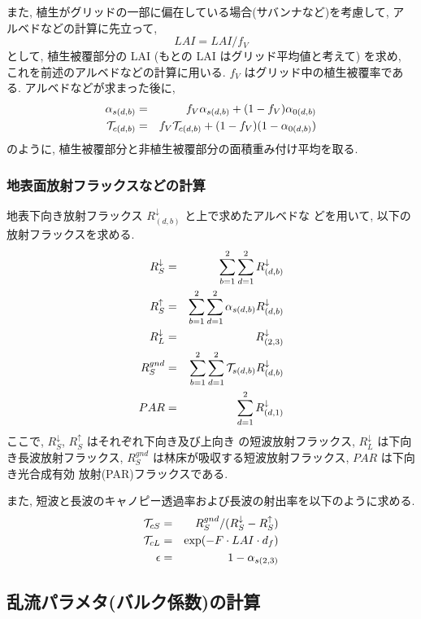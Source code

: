 また, 植生がグリッドの一部に偏在している場合(サバンナなど)を考慮して, ア
ルベドなどの計算に先立って,
\begin{equation}
  LAI = LAI / f_V
\end{equation}
として, 植生被覆部分の LAI (もとの LAI はグリッド平均値と考えて) を求め,
これを前述のアルベドなどの計算に用いる.
$f_V$ はグリッド中の植生被覆率である.
アルベドなどが求まった後に,
\begin{eqnarray}
  \alpha_{s(d,b)} &=& f_V \alpha_{s(d,b)}
                       + ( 1 - f_V ) \alpha_{0(d,b)} \\
  {\cal{T}}_{c(d,b)} &=& f_V {\cal{T}}_{c(d,b)}
                       + ( 1 - f_V ) ( 1 - \alpha_{0(d,b)} )
\end{eqnarray}
のように, 植生被覆部分と非植生被覆部分の面積重み付け平均を取る.

\subsubsection{地表面放射フラックスなどの計算}

地表下向き放射フラックス $R^{\downarrow}_{(d,b)}$ と上で求めたアルベドな
どを用いて, 以下の放射フラックスを求める.
\begin{eqnarray}
 R^{\downarrow}_S &=& \sum_{b=1}^2\sum_{d=1}^2 R^{\downarrow}_{(d,b)} \\
 R^{\uparrow}_S &=& \sum_{b=1}^2\sum_{d=1}^2 \alpha_{s(d,b)} R^{\downarrow}_{(d,b)} \\
 R^{\downarrow}_L &=& R^{\downarrow}_{(2,3)} \\
 R^{gnd}_S &=& \sum_{b=1}^2\sum_{d=1}^2 {\cal{T}}_{s(d,b)} R^{\downarrow}_{(d,b)} \\
 PAR &=& \sum_{d=1}^2 R^{\downarrow}_{(d,1)}
\end{eqnarray}
ここで, $R^{\downarrow}_S$, $R^{\uparrow}_S$ はそれぞれ下向き及び上向き
の短波放射フラックス, $R^{\downarrow}_L$ は下向き長波放射フラックス,
$R^{gnd}_S$ は林床が吸収する短波放射フラックス, $PAR$ は下向き光合成有効
放射(PAR)フラックスである.

また, 短波と長波のキャノピー透過率および長波の射出率を以下のように求める.
\begin{eqnarray}
 {\cal{T}}_{cS} &=& R^{gnd}_S / ( R^{\downarrow}_S - R^{\uparrow}_S ) \\
 {\cal{T}}_{cL} &=& \exp( - F \cdot LAI \cdot d_f ) \\
 \epsilon &=& 1 - \alpha_{s(2,3)}
\end{eqnarray}

\subsection{乱流パラメタ(バルク係数)の計算}

